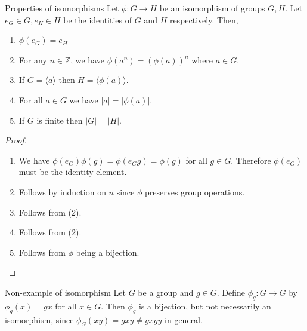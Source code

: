 \documentclass[12pt]{article}
\newcommand{\Z}{\mathbb{Z}}
\begin{document}
	\begin{mythm}{Properties of isomorphisms}{}
		Let $\phi:G\to H$ be an isomorphism of groups $G, H$. Let $e_G\in G, e_H\in H$ be the identities of $G$ and $H$ respectively. Then,
		\begin{enumerate}
			\item $\phi(e_G)=e_H$
			\item For any $n\in\Z$, we have $\phi(a^n)=(\phi(a))^n$ where $a\in G$.
			\item If $G=\langle a\rangle$ then $H=\langle \phi(a)\rangle$.
			\item For all $a\in G$ we have $|a|=|\phi(a)|$.
			\item If $G$ is finite then $|G|=|H|$.
		\end{enumerate}
		\begin{proof}~\\
			\begin{enumerate}
				\item We have $\phi(e_G)\phi(g)=\phi(e_Gg)=\phi(g)$ for all $g\in G$. Therefore $\phi(e_G)$ must be the identity element.
				\item Follows by induction on $n$ since $\phi$ preserves group operations.
				\item Follows from (2).
				\item Follows from (2).
				\item Follows from $\phi$ being a bijection.
			\end{enumerate}
		\end{proof}
	\end{mythm}
	
	\begin{myex}{Non-example of isomorphism}{}
		Let $G$ be a group and $g\in G$. Define $\phi_g:G\to G$ by $\phi_g(x)=gx$ for all $x\in G$. Then $\phi_g$ is a bijection, but not necessarily an isomorphism, since $\phi_G(xy)=gxy\neq gxgy$ in general.
	\end{myex}
	
\end{document}
